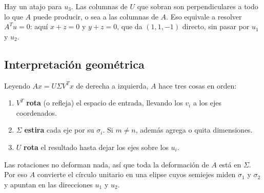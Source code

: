 \documentclass[11pt,letterpaper]{article}
\begin{document}
\begin{idea}
    Hay un atajo para $u_3$. Las columnas de $U$ que sobran son
    perpendiculares a todo lo que $A$ puede producir, o sea a las
    columnas de $A$. Eso equivale a resolver $A^{T}u = 0$: aquí
    $x + z = 0$ y $y + z = 0$, que da $(1, 1, -1)$ directo, sin pasar
    por $u_1$ y $u_2$.
\end{idea}


\subsection*{Interpretación geométrica}

Leyendo $Ax = U\Sigma V^{T}x$ de derecha a izquierda, $A$ hace tres
cosas en orden:

\begin{enumerate}[itemsep=0.2em]
    \item $V^{T}$ \textbf{rota} (o refleja) el espacio de entrada,
          llevando los $v_i$ a los ejes coordenados.
    \item $\Sigma$ \textbf{estira} cada eje por su $\sigma_i$. Si
          $m \neq n$, además agrega o quita dimensiones.
    \item $U$ \textbf{rota} el resultado hasta dejar los ejes sobre
          los $u_i$.
\end{enumerate}

Las rotaciones no deforman nada, así que toda la deformación de $A$
está en $\Sigma$. Por eso $A$ convierte el círculo unitario en una
elipse cuyos semiejes miden $\sigma_1$ y $\sigma_2$ y apuntan en las
direcciones $u_1$ y $u_2$.
\end{document}
